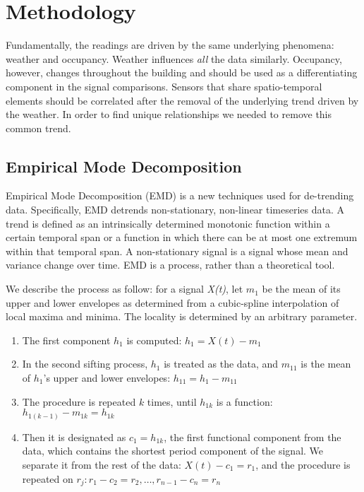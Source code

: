 \section{Methodology}\label{method}

Fundamentally, the readings are driven by the same underlying phenomena: 
weather and occupancy.  Weather influences \emph{all} the data similarly.  Occupancy, however, changes
throughout the building and should be used as a differentiating component in the signal
comparisons.  Sensors that share spatio-temporal elements should be correlated after the removal
of the underlying trend driven by the weather.  In order to find unique relationships we needed to remove 
this common trend.

\subsection{Empirical Mode Decomposition}
Empirical Mode Decomposition (EMD) \cite{huang:emd1998} is a new techniques used for de-trending data.
Specifically, EMD detrends non-stationary, non-linear timeseries data.  A trend is defined as 
an intrinsically determined monotonic function within a certain temporal span or a function in which there 
can be at most one extremum within that temporal span.  A non-stationary signal is a signal whose mean and
variance change over time.  EMD is a process, rather than a theoretical tool.

We describe the process as follow:  for a signal \emph{X(t)}, let $m_1$ be the mean of its upper and
lower envelopes as determined from a cubic-spline interpolation of local maxima and minima. The locality 
is determined by an arbitrary parameter.

\begin{enumerate}
\item The first component $h_1$ is computed: $h_1=X(t)-m_1$
\item In the second sifting process, $h_1$ is treated as the data, and $m_{11}$ is the mean of $h_1$'s upper and lower envelopes: $h_{11}=h_1-m_{11}$
\item The procedure is repeated $k$ times, until $h_{1k}$ is a function: $h_{1(k-1)}-m_{1k}=h_{1k}$
\item Then it is designated as $c_1=h_{1k}$, the first functional component from the data, which contains the shortest period component of the signal. We separate it from the rest of the data: $X(t)-c_1 = r_1$, and the procedure is
repeated on $r_j: r_1-c_2 = r_2,\dots,r_{n-1} - c_n = r_n$
\end{enumerate}

